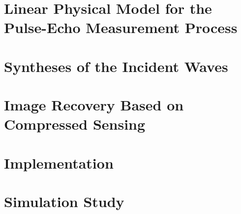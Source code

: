 \documentclass[10pt,twocolumn,romanappendices,final]{IEEEtran}
\begin{document}
\section{Linear Physical Model for the Pulse-Echo Measurement Process}
\label{sec:linear_model}


\section{Syntheses of the Incident Waves}
\label{sec:syn_p_in}


\section{Image Recovery Based on Compressed Sensing}
\label{sec:recovery}


\section{Implementation}
\label{sec:implementation}


\section{Simulation Study}
\label{sec:simulation_study}

\end{document}
